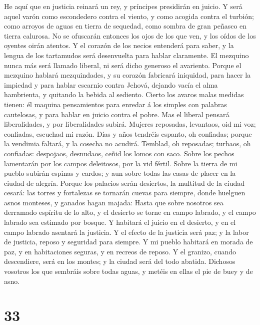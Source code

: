  He aquí que en justicia reinará un rey, y príncipes
presidirán en juicio.  Y será aquel varón como escondedero
contra el viento, y como acogida contra el turbión; como arroyos de
aguas en tierra de sequedad, como sombra de gran peñasco en tierra
calurosa.  No se ofuscarán entonces los ojos de los que ven,
y los oídos de los oyentes oirán atentos.  Y el corazón de
los necios entenderá para saber, y la lengua de los tartamudos será
desenvuelta para hablar claramente.  El mezquino nunca más
será llamado liberal, ni será dicho generoso el avariento. 
Porque el mezquino hablará mezquindades, y su corazón fabricará
iniquidad, para hacer la impiedad y para hablar escarnio contra Jehová,
dejando vacía el alma hambrienta, y quitando la bebida al sediento.
 Cierto los avaros malas medidas tienen: él maquina
pensamientos para enredar á los simples con palabras cautelosas, y para
hablar en juicio contra el pobre.  Mas el liberal pensará
liberalidades, y por liberalidades subirá.  Mujeres
reposadas, levantaos, oid mi voz; confiadas, escuchad mi razón.
 Días y años tendréis espanto, oh confiadas; porque la
vendimia faltará, y la cosecha no acudirá.  Temblad, oh
reposadas; turbaos, oh confiadas: despojaos, desnudaos, ceñid los lomos
con saco.  Sobre los pechos lamentarán por los campos
deleitosos, por la vid fértil.  Sobre la tierra de mi
pueblo subirán espinas y cardos; y aun sobre todas las casas de placer
en la ciudad de alegría.  Porque los palacios serán
desiertos, la multitud de la ciudad cesará: las torres y fortalezas se
tornarán cuevas para siempre, donde huelguen asnos monteses, y ganados
hagan majada:  Hasta que sobre nosotros sea derramado
espíritu de lo alto, y el desierto se torne en campo labrado, y el campo
labrado sea estimado por bosque.  Y habitará el juicio en
el desierto, y en el campo labrado asentará la justicia.  Y
el efecto de la justicia será paz; y la labor de justicia, reposo y
seguridad para siempre.  Y mi pueblo habitará en morada de
paz, y en habitaciones seguras, y en recreos de reposo.  Y
el granizo, cuando descendiere, será en los montes; y la ciudad será del
todo abatida.  Dichosos vosotros los que sembráis sobre
todas aguas, y metéis en ellas el pie de buey y de asno.

\hypertarget{section-32}{%
\section{33}\label{section-32}}

